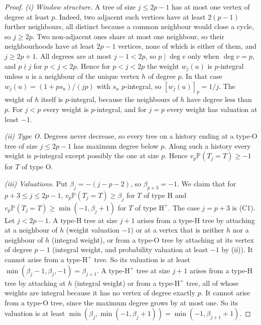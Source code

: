 \documentclass[11pt]{article}
\theoremstyle{remark}
\newcommand{\Prob}{\mathbb P}
\newcommand{\res}[1]{[#1]_p}
\begin{document}
\begin{proof}
\emph{(i) Window structure.} A tree of size $j\le2p-1$ has at most one vertex of degree at least $p$. Indeed, two adjacent such vertices have at least $2(p-1)$ further neighbours, all distinct because a common neighbour would close a cycle, so $j\ge2p$. Two non-adjacent ones share at most one neighbour, so their neighbourhoods have at least $2p-1$ vertices, none of which is either of them, and $j\ge2p+1$. All degrees are at most $j-1<2p$, so $p\mid\deg v$ only when $\deg v=p$, and $p\nmid j$ for $p<j<2p$. Hence for $p<j<2p$ the weight $w_j(u)$ is $p$-integral unless $u$ is a neighbour of the unique vertex $h$ of degree $p$. In that case $w_j(u)=(1+ps_u)/(jp)$ with $s_u$ $p$-integral, so $\res{w_j(u)}=1/j$. The weight of $h$ itself is $p$-integral, because the neighbours of $h$ have degree less than $p$. For $j<p$ every weight is $p$-integral, and for $j=p$ every weight has valuation at least $-1$.

\emph{(ii) Type O.} Degrees never decrease, so every tree on a history ending at a type-O tree of size $j\le2p-1$ has maximum degree below $p$. Along such a history every weight is $p$-integral except possibly the one at size $p$. Hence $v_p\Prob(T_j=T)\ge-1$ for $T$ of type O.

\emph{(iii) Valuations.} Put $\beta_j=-(j-p-2)$, so $\beta_{p+3}=-1$. We claim that for $p+3\le j\le2p-1$, $v_p\Prob(T_j=T)\ge\beta_j$ for $T$ of type H and $v_p\Prob(T_j=T)\ge\min(-1,\beta_j+1)$ for $T$ of type $\mathrm H^+$. The case $j=p+3$ is (C1). Let $j<2p-1$. A type-H tree at size $j+1$ arises from a type-H tree by attaching at a neighbour of $h$ (weight valuation $-1$) or at a vertex that is neither $h$ nor a neighbour of $h$ (integral weight), or from a type-O tree by attaching at its vertex of degree $p-1$ (integral weight, and probability valuation at least $-1$ by (ii)). It cannot arise from a type-$\mathrm H^+$ tree. So its valuation is at least $\min(\beta_j-1,\beta_j,-1)=\beta_{j+1}$. A type-$\mathrm H^+$ tree at size $j+1$ arises from a type-H tree by attaching at $h$ (integral weight) or from a type-$\mathrm H^+$ tree, all of whose weights are integral because it has no vertex of degree exactly $p$. It cannot arise from a type-O tree, since the maximum degree grows by at most one. So its valuation is at least $\min(\beta_j,\min(-1,\beta_j+1))=\min(-1,\beta_{j+1}+1)$.


\end{proof}
\end{document}
